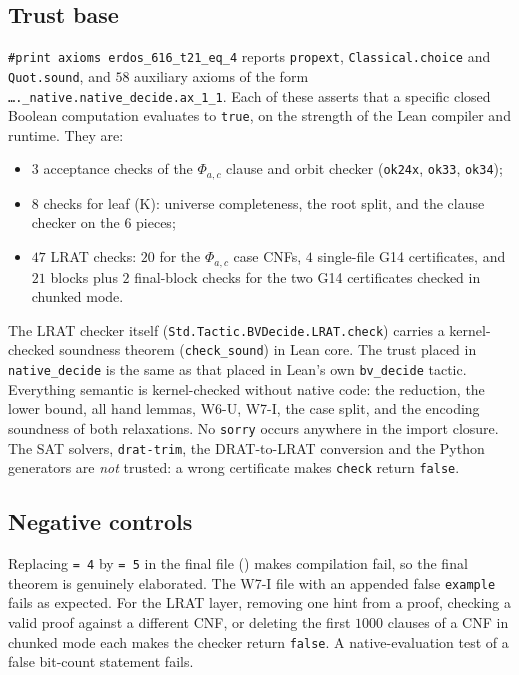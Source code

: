 \documentclass[11pt]{amsart}
\theoremstyle{definition}
\newcommand{\file}[1]{\path{#1}}
\begin{document}
\subsection{Trust base}
\texttt{\#print axioms erdos\_616\_t21\_eq\_4} reports \texttt{propext}, \texttt{Classical.choice} and \texttt{Quot.sound}, and $58$ auxiliary axioms of the form \texttt{\dots.\_native.native\_decide.ax\_1\_1}. Each of these asserts that a specific closed Boolean computation evaluates to \texttt{true}, on the strength of the Lean compiler and runtime. They are:
\begin{itemize}
\item $3$ acceptance checks of the $\Phi_{a,c}$ clause and orbit checker (\texttt{ok24x}, \texttt{ok33}, \texttt{ok34});
\item $8$ checks for leaf (K): universe completeness, the root split, and the clause checker on the $6$ pieces;
\item $47$ LRAT checks: $20$ for the $\Phi_{a,c}$ case CNFs, $4$ single-file G14 certificates, and $21$ blocks plus $2$ final-block checks for the two G14 certificates checked in chunked mode.
\end{itemize}
The LRAT checker itself (\texttt{Std.Tactic.BVDecide.LRAT.check}) carries a kernel-checked soundness theorem (\texttt{check\_sound}) in Lean core. The trust placed in \texttt{native\_decide} is the same as that placed in Lean's own \texttt{bv\_decide} tactic. Everything semantic is kernel-checked without native code: the reduction, the lower bound, all hand lemmas, W6-U, W7-I, the case split, and the encoding soundness of both relaxations. No \texttt{sorry} occurs anywhere in the import closure. The SAT solvers, \texttt{drat-trim}, the DRAT-to-LRAT conversion and the Python generators are \emph{not} trusted: a wrong certificate makes \texttt{check} return \texttt{false}.

\subsection{Negative controls}
Replacing \texttt{= 4} by \texttt{= 5} in the final file (\file{final/Neg.lean}) makes compilation fail, so the final theorem is genuinely elaborated. The W7-I file with an appended false \texttt{example} fails as expected. For the LRAT layer, removing one hint from a proof, checking a valid proof against a different CNF, or deleting the first $1000$ clauses of a CNF in chunked mode each makes the checker return \texttt{false}. A native-evaluation test of a false bit-count statement fails.
\end{document}
